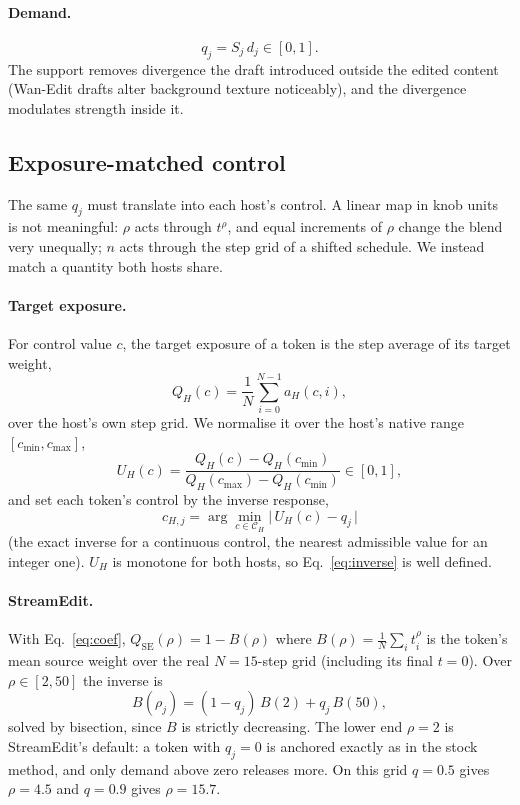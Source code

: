 \documentclass[10pt,twocolumn]{article}
\begin{document}
\paragraph{Demand.}
\begin{equation}
q_j = S_j\, d_j \in [0,1].
\end{equation}
The support removes divergence the draft introduced outside the edited content (Wan-Edit drafts alter background texture noticeably), and the divergence modulates strength inside it.

\subsection{Exposure-matched control}
\label{sec:exposure}

The same $q_j$ must translate into each host's control. A linear map in knob units is not meaningful: $\rho$ acts through $t^{\rho}$, and equal increments of $\rho$ change the blend very unequally; $n$ acts through the step grid of a shifted schedule. We instead match a quantity both hosts share.

\paragraph{Target exposure.}
For control value $c$, the target exposure of a token is the step average of its target weight,
\begin{equation}
Q_H(c) = \frac{1}{N}\sum_{i=0}^{N-1} a_H(c,i),
\end{equation}
over the host's own step grid. We normalise it over the host's native range $[c_{\min},c_{\max}]$,
\begin{equation}
U_H(c) = \frac{Q_H(c)-Q_H(c_{\min})}{Q_H(c_{\max})-Q_H(c_{\min})}\in[0,1],
\end{equation}
and set each token's control by the inverse response,
\begin{equation}
\boxed{\,c_{H,j} = \arg\min_{c\in\mathcal{C}_H}\big|\,U_H(c) - q_j\,\big|\,}
\label{eq:inverse}
\end{equation}
(the exact inverse for a continuous control, the nearest admissible value for an integer one). $U_H$ is monotone for both hosts, so Eq.~\eqref{eq:inverse} is well defined.

\paragraph{StreamEdit.}
With Eq.~\eqref{eq:coef}, $Q_{\mathrm{SE}}(\rho) = 1 - B(\rho)$ where $B(\rho)=\frac1N\sum_i t_i^{\rho}$ is the token's mean source weight over the real $N=15$-step grid (including its final $t=0$). Over $\rho\in[2,50]$ the inverse is
\begin{equation}
B(\rho_j) = (1-q_j)\,B(2) + q_j\,B(50),
\end{equation}
solved by bisection, since $B$ is strictly decreasing. The lower end $\rho=2$ is StreamEdit's default: a token with $q_j=0$ is anchored exactly as in the stock method, and only demand above zero releases more. On this grid $q=0.5$ gives $\rho=4.5$ and $q=0.9$ gives $\rho=15.7$.
\end{document}
